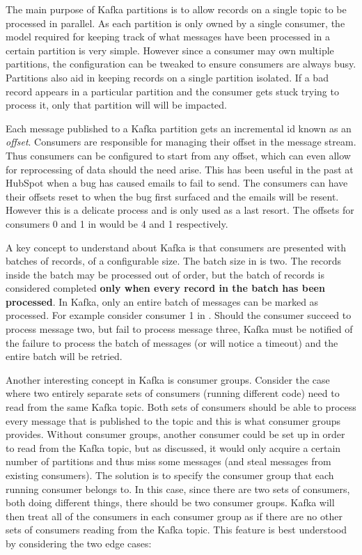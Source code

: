 The main purpose of Kafka partitions is to allow records on a single topic to be processed in parallel. As each partition is only owned by a single consumer, the model required for keeping track of what messages have been processed in a certain partition is very simple. However since a consumer may own multiple partitions, the configuration can be tweaked to ensure consumers are always busy. Partitions also aid in keeping records on a single partition isolated. If a bad record appears in a particular partition and the consumer gets stuck trying to process it, only that partition will will be impacted.

Each message published to a Kafka partition gets an incremental id known as an \textit{offset}. Consumers are responsible for managing their offset in the message stream. Thus consumers can be configured to start from any offset, which can even allow for reprocessing of data should the need arise. This has been useful in the past at HubSpot when a bug has caused emails to fail to send. The consumers can have their offsets reset to when the bug first surfaced and the emails will be resent. However this is a delicate process and is only used as a last resort. The offsets for consumers 0 and 1 in  would be 4 and 1 respectively.

A key concept to understand about Kafka is that consumers are presented with batches of records, of a configurable size. The batch size in  is two. The records inside the batch may be processed out of order, but the batch of records is considered completed \textbf{only when every record in the batch has been processed}. In Kafka, only an entire batch of messages can be marked as processed. For example consider consumer 1 in . Should the consumer succeed to process message two, but fail to process message three, Kafka must be notified of the failure to process the batch of messages (or will notice a timeout) and the entire batch will be retried.


Another interesting concept in Kafka is consumer groups. Consider the case where two entirely separate sets of consumers (running different code) need to read from the same Kafka topic. Both sets of consumers should be able to process every message that is published to the topic and this is what consumer groups provides. Without consumer groups, another consumer could be set up in order to read from the Kafka topic, but as discussed, it would only acquire a certain number of partitions and thus miss some messages (and steal messages from existing consumers). The solution is to specify the consumer group that each running consumer belongs to. In this case, since there are two sets of consumers, both doing different things, there should be two consumer groups. Kafka will then treat all of the consumers in each consumer group as if there are no other sets of consumers reading from the Kafka topic. This feature is best understood by considering the two edge cases:

